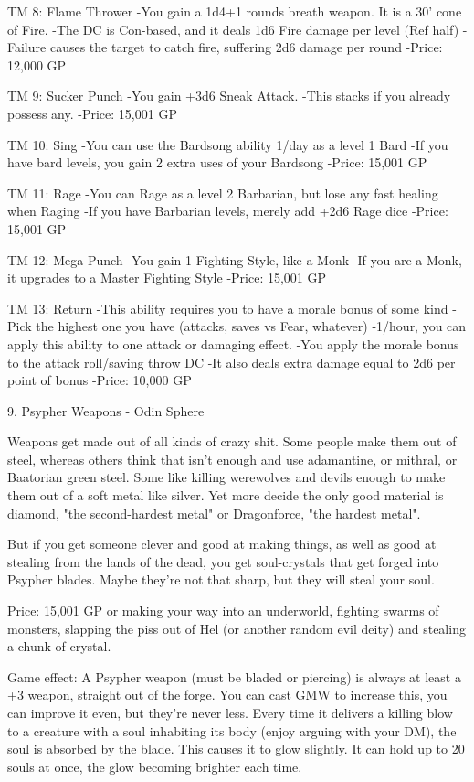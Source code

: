 \begin{multicols}{2}
TM 8: Flame Thrower
-You gain a 1d4+1 rounds breath weapon. It is a 30' cone of Fire.
-The DC is Con-based, and it deals 1d6 Fire damage per level (Ref half)
-Failure causes the target to catch fire, suffering 2d6 damage per round
-Price: 12,000 GP

TM 9: Sucker Punch
-You gain +3d6 Sneak Attack.
-This stacks if you already possess any.
-Price: 15,001 GP

TM 10: Sing
-You can use the Bardsong ability 1/day as a level 1 Bard
-If you have bard levels, you gain 2 extra uses of your Bardsong
-Price: 15,001 GP

TM 11: Rage
-You can Rage as a level 2 Barbarian, but lose any fast healing when Raging
-If you have Barbarian levels, merely add +2d6 Rage dice
-Price: 15,001 GP

TM 12: Mega Punch
-You gain 1 Fighting Style, like a Monk
-If you are a Monk, it upgrades to a Master Fighting Style
-Price: 15,001 GP

TM 13: Return
-This ability requires you to have a morale bonus of some kind
-Pick the highest one you have (attacks, saves vs Fear, whatever)
-1/hour, you can apply this ability to one attack or damaging effect.
-You apply the morale bonus to the attack roll/saving throw DC
-It also deals extra damage equal to 2d6 per point of bonus
-Price: 10,000 GP



9. Psypher Weapons - Odin Sphere

Weapons get made out of all kinds of crazy shit. Some people make them out of steel, whereas others think that isn't enough and use adamantine, or mithral, or Baatorian green steel. Some like killing werewolves and devils enough to make them out of a soft metal like silver. Yet more decide the only good material is diamond, "the second-hardest metal" or Dragonforce, "the hardest metal".

But if you get someone clever and good at making things, as well as good at stealing from the lands of the dead, you get soul-crystals that get forged into Psypher blades. Maybe they're not that sharp, but they will steal your soul.

Price: 15,001 GP or making your way into an underworld, fighting swarms of monsters, slapping the piss out of Hel (or another random evil deity) and stealing a chunk of crystal.

Game effect:
A Psypher weapon (must be bladed or piercing) is always at least a +3 weapon, straight out of the forge. You can cast GMW to increase this, you can improve it even, but they're never less. Every time it delivers a killing blow to a creature with a soul inhabiting its body (enjoy arguing with your DM), the soul is absorbed by the blade. This causes it to glow slightly. It can hold up to 20 souls at once, the glow becoming brighter each time.


\end{multicols}
